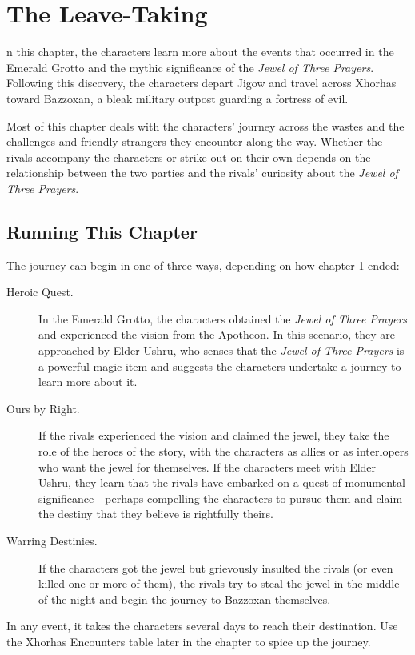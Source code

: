 \documentclass[10pt,a4paper,twoside,bg=print,twocolumn,openany,nodeprecatedcode]{dndbook}
\begin{document}
\chapter{The Leave-Taking}
n this chapter, the characters learn more about the events that occurred in the Emerald Grotto and the mythic significance of the \textit{Jewel of Three Prayers}. Following this discovery, the characters depart Jigow and travel across Xhorhas toward Bazzoxan, a bleak military outpost guarding a fortress of evil.


Most of this chapter deals with the characters' journey across the wastes and the challenges and friendly strangers they encounter along the way. Whether the rivals accompany the characters or strike out on their own depends on the relationship between the two parties and the rivals' curiosity about the \textit{Jewel of Three Prayers}.

\section{Running This Chapter}
The journey can begin in one of three ways, depending on how chapter 1 ended:


\begin{description}
\item[Heroic Quest.]
In the Emerald Grotto, the characters obtained the \textit{Jewel of Three Prayers} and experienced the vision from the Apotheon. In this scenario, they are approached by Elder Ushru, who senses that the \textit{Jewel of Three Prayers} is a powerful magic item and suggests the characters undertake a journey to learn more about it.
\item[Ours by Right.]
If the rivals experienced the vision and claimed the jewel, they take the role of the heroes of the story, with the characters as allies or as interlopers who want the jewel for themselves. If the characters meet with Elder Ushru, they learn that the rivals have embarked on a quest of monumental significance—perhaps compelling the characters to pursue them and claim the destiny that they believe is rightfully theirs.
\item[Warring Destinies.]
If the characters got the jewel but grievously insulted the rivals (or even killed one or more of them), the rivals try to steal the jewel in the middle of the night and begin the journey to Bazzoxan themselves.
\end{description}

In any event, it takes the characters several days to reach their destination. Use the Xhorhas Encounters table later in the chapter to spice up the journey.
\end{document}
